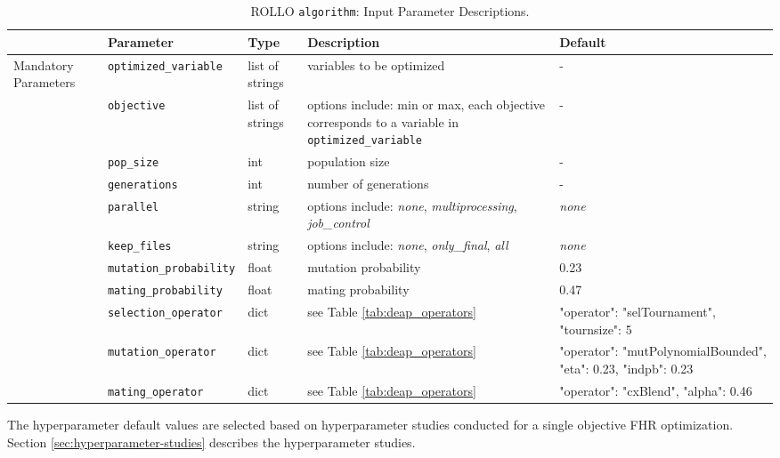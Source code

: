 \begin{table}[htbp]
    \centering
    \onehalfspacing
    \caption{\acrfull{ROLLO} \texttt{algorithm}: Input Parameter Descriptions.}
	\label{tab:algorithm-inputs}
    \scriptsize
    \begin{tabular}{l|lp{1.5cm}p{3.7cm}p{3.5cm}}
    \hline
    & \textbf{Parameter} & \textbf{Type} & \textbf{Description} & \textbf{Default} \\
    \hline
    \multirow{9}{1.8cm}{Mandatory Parameters} 
    & \texttt{optimized\_variable} & list of strings & variables to be optimized & -\\
    \cline{2-5}
    & \texttt{objective} & list of strings & options include: min or max,
    each objective corresponds to a variable in \texttt{optimized\_variable} & -\\
    \cline{2-5}
    & \texttt{pop\_size} & int & population size & -\\
    \cline{2-5}
    & \texttt{generations} & int & number of generations & -\\
    \hline
    \multirow{15}{1.8cm}{Optional Parameters} 
    & \texttt{parallel} & string & options include: \textit{none}, \textit{multiprocessing}, \textit{job\_control} & \textit{none} \\
    \cline{2-5}
    & \texttt{keep\_files} & string & options include: \textit{none}, \textit{only\_final}, \textit{all} & \textit{none} \\
    \cline{2-5}
    & \texttt{mutation\_probability} & float & mutation probability & 0.23 \\
    \cline{2-5}
    & \texttt{mating\_probability} & float & mating probability & 0.47 \\
    \cline{2-5}
    & \texttt{selection\_operator} & dict & see Table \ref{tab:deap_operators} & \scriptsize{{"operator": "selTournament", "tournsize": 5}}\\
    \cline{2-5}
    & \texttt{mutation\_operator} & dict & see Table \ref{tab:deap_operators} & \scriptsize{{"operator": "mutPolynomialBounded", "eta": 0.23, "indpb": 0.23}}\\
    \cline{2-5}
    & \texttt{mating\_operator} & dict & see Table \ref{tab:deap_operators} & \scriptsize{{"operator": "cxBlend", "alpha": 0.46}}\\
    \hline 
    \end{tabular}
    \end{table}
The hyperparameter default values are selected based on hyperparameter studies conducted 
for a single objective \gls{FHR} optimization. 
Section \ref{sec:hyperparameter-studies} describes the hyperparameter studies. 

